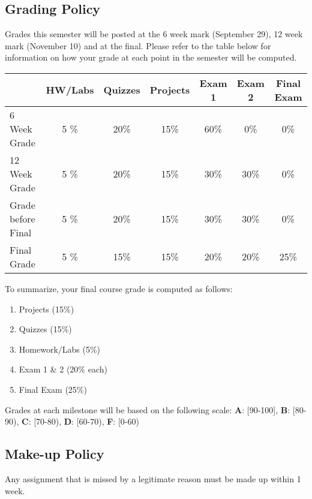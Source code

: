 \documentclass[letterpaper,hidelinks,oneside,11pt]{article}%
\begin{document}
\subsection*{Grading Policy}

Grades this semester will be posted at the 6 week mark (September 29), 12 week mark (November 10) and at the final. Please refer to the table below for information on how your grade at each point in the semester will be computed.

\begin{center}
\begin{tabular}{|l|c|c|c|c|c|c|}
  \hline
 &  \textbf{HW/Labs} & \textbf{Quizzes} & \textbf{Projects} & \textbf{Exam 1} & \textbf{Exam 2} & \textbf{Final Exam} \\ \hline
6 Week Grade       & 5 \% & 20\% & 15\% & 60\%   & 0\%    & 0\% \\ \hline
12 Week Grade      & 5 \% & 20\% & 15\% & 30\%   & 30\%   & 0\% \\ \hline
Grade before Final & 5 \% & 20\% & 15\% & 30\%   & 30\%   & 0\% \\ \hline
Final Grade        & 5 \% & 15\% & 15\% & 20\%   & 20\%   & 25\% \\
  \hline
\end{tabular}\end{center}

To summarize, your final course grade is computed as follows:

\begin{enumerate} \itemsep0em 
	\item Projects  (15\%)
	\item Quizzes (15\%)
	\item Homework/Labs (5\%)
	\item Exam 1 \& 2 (20\% each)
	\item Final Exam (25\%)
\end{enumerate}

Grades at each milestone will be based on the following scale: 
\textbf{A}: [90-100], \textbf{B}: [80-90), \textbf{C}: [70-80), \textbf{D}: [60-70), \textbf{F}: [0-60)




\subsection*{Make-up Policy}

Any assignment that is missed by a legitimate reason must be made up within 1 week.
\end{document}
